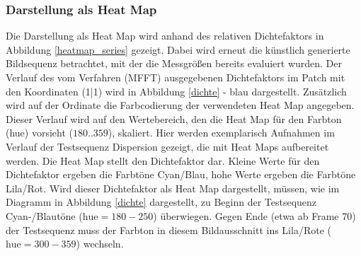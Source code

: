 \subsubsection{Darstellung als Heat Map}
Die Darstellung als Heat Map wird anhand des relativen Dichtefaktors in Abbildung \ref{heatmap_series} gezeigt. Dabei wird erneut die künstlich generierte Bildsequenz betrachtet, mit der die Messgrößen bereits evaluiert wurden. Der Verlauf des vom Verfahren (MFFT) ausgegebenen Dichtefaktors im Patch mit den Koordinaten (1|1) wird in Abbildung \ref{dichte} - blau dargestellt. Zusätzlich wird auf der Ordinate die Farbcodierung der verwendeten Heat Map angegeben. Dieser Verlauf wird auf den Wertebereich, den die Heat Map für den Farbton (hue) vorsieht (${180..359}$), skaliert. Hier werden exemplarisch Aufnahmen im Verlauf der Testsequenz Dispersion gezeigt, die mit Heat Maps aufbereitet werden. Die Heat Map stellt den Dichtefaktor dar. Kleine Werte für den Dichtefaktor ergeben die Farbtöne Cyan/Blau, hohe Werte ergeben die Farbtöne Lila/Rot. Wird dieser Dichtefaktor als Heat Map dargestellt, müssen, wie im Diagramm in Abbildung \ref{dichte} dargestellt, zu Beginn der Testsequenz Cyan-/Blautöne ($\text{hue}=180-250$) überwiegen. Gegen Ende (etwa ab Frame 70) der Testsequenz muss der Farbton in diesem Bildausschnitt ins Lila/Rote ($\text{hue}=300-359$) wechseln. 
\vskip 10pt
